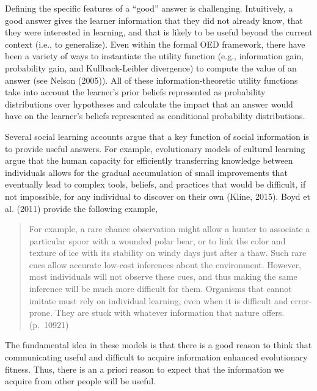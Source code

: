 \documentclass[english,floatsintext,man]{apa6}
\theoremstyle{definition}
\theoremstyle{definition}
\theoremstyle{definition}
\theoremstyle{remark}
\begin{document}
Defining the specific features of a \enquote{good} answer is
challenging. Intuitively, a good answer gives the learner information
that they did not already know, that they were interested in learning,
and that is likely to be useful beyond the current context (i.e., to
generalize). Even within the formal OED framework, there have been a
variety of ways to instantiate the utility function (e.g., information
gain, probability gain, and Kullback-Leibler divergence) to compute the
value of an answer (see Nelson (2005)). All of these
information-theoretic utility functions take into account the learner's
prior beliefs represented as probability distributions over hypotheses
and calculate the impact that an answer would have on the learner's
beliefs represented as conditional probability distributions.

Several social learning accounts argue that a key function of social
information is to provide useful answers. For example, evolutionary
models of cultural learning argue that the human capacity for
efficiently transferring knowledge between individuals allows for the
gradual accumulation of small improvements that eventually lead to
complex tools, beliefs, and practices that would be difficult, if not
impossible, for any individual to discover on their own (Kline, 2015).
Boyd et al. (2011) provide the following example,

\begin{quote}
For example, a rare chance observation might allow a hunter to associate
a particular spoor with a wounded polar bear, or to link the color and
texture of ice with its stability on windy days just after a thaw. Such
rare cues allow accurate low-cost inferences about the environment.
However, most individuals will not observe these cues, and thus making
the same inference will be much more difficult for them. Organisms that
cannot imitate must rely on individual learning, even when it is
difficult and error-prone. They are stuck with whatever information that
nature offers. (p.~10921)
\end{quote}

\noindent
The fundamental idea in these models is that there is a good reason to
think that communicating useful and difficult to acquire information
enhanced evolutionary fitness. Thus, there is an a priori reason to
expect that the information we acquire from other people will be useful.
\end{document}
